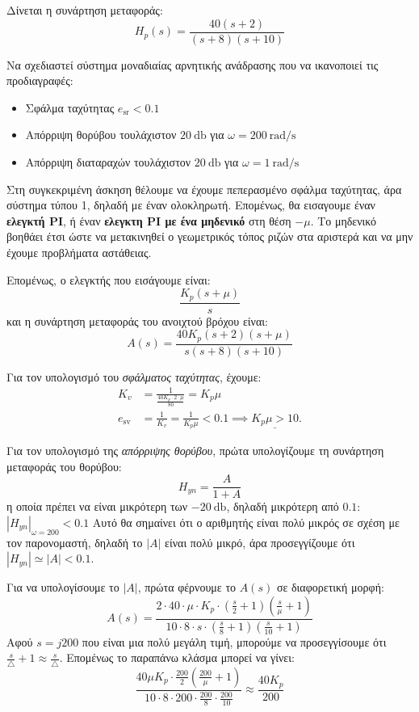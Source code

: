 \documentclass[11pt,a4paper,notitlepage,fleqn]{article}
\begin{document}
\begin{exercise}
Δίνεται η συνάρτηση μεταφοράς:
\[
H_p(s) = \frac{40(s+2)}{(s+8)(s+10)}
\]

Να σχεδιαστεί σύστημα μοναδιαίας αρνητικής ανάδρασης που να ικανοποιεί τις προδιαγραφές:
\begin{itemize}
	\item Σφάλμα ταχύτητας \( e_{\mathrm{sr}} < 0.1 \)
	\item Απόρριψη θορύβου τουλάχιστον \( \SI{20}{\decibel} \) για \( \omega = \SI{200}{\radian/\second} \)
	\item Απόρριψη διαταραχών τουλάχιστον \( \SI{20}{\decibel} \) για \( \omega = \SI{1}{\radian/\second} \)
\end{itemize}

\tcblower
Στη συγκεκριμένη άσκηση θέλουμε να έχουμε πεπερασμένο σφάλμα ταχύτητας, άρα σύστημα τύπου 1,
δηλαδή με έναν ολοκληρωτή. Επομένως, θα εισαγουμε έναν \textbf{ελεγκτή PI}, ή έναν
\textbf{ελεγκτη PI με ένα μηδενικό} στη θέση \( -μ \). Το μηδενικό βοηθάει έτσι ώστε να
μετακινηθεί ο γεωμετρικός τόπος ριζών στα αριστερά και να μην έχουμε προβλήματα αστάθειας.

Επομένως, ο ελεγκτής που εισάγουμε είναι:
\[
\frac{K_p(s+μ)}{s}
\]
και η συνάρτηση μεταφοράς του ανοιχτού βρόχου είναι:
\[
A(s) = \frac{40K_p(s+2)(s+μ)}{s(s+8)(s+10)}
\]

Για τον υπολογισμό του \textit{σφάλματος ταχύτητας}, έχουμε:
\begin{align*}
	K_v &= \frac{1}{\frac{40K_p\cdot 2\cdot μ}{80}} = K_p μ\\
	e_{\mathrm{sv}} &= \frac{1}{K_v} = \frac{1}{K_p μ} < 0.1 \implies
	\underline{K_p μ > 10}.
\end{align*}

Για τον υπολογισμό της \textit{απόρριψης θορύβου}, πρώτα υπολογίζουμε τη συνάρτηση μεταφοράς
του θορύβου:
\[
H_{yn} = \frac{A}{1+A}
\]
η οποία πρέπει να είναι μικρότερη των \( \SI{-20}{\decibel} \), δηλαδή μικρότερη από \( 0.1 \): \( \left|H_{yn}\right|_{\omega=200} < 0.1 \)
Αυτό θα σημαίνει ότι ο αριθμητής είναι πολύ μικρός σε σχέση με τον παρονομαστή, δηλαδή το
\( |A| \) είναι πολύ μικρό, άρα προσεγγίζουμε ότι \( \left|H_{yn}\right| \simeq |A| < 0.1 \).

Για να υπολογίσουμε το \( \left|A\right| \), πρώτα φέρνουμε το \( A(s) \) σε διαφορετική
μορφή:
\[
A(s) = \frac{2\cdot 40 \cdot μ \cdot K_p \cdot \left(\frac{s}{2}+1\right)\left(
	\frac{s}{μ}+1
	\right)}{10\cdot 8\cdot s \cdot \left( \frac{s}{8}+1 \right)\left(\frac{s}{10}+1\right)}
\]
Αφού \( s = j200 \) που είναι μια πολύ μεγάλη τιμή, μπορούμε να προσεγγίσουμε ότι
\( \frac{s}{\triangle} + 1 \approx \frac{s}{\triangle} \). Επομένως το παραπάνω κλάσμα μπορεί
να γίνει:
\[
\frac{40μK_p\cdot \frac{200}{2}\left(\frac{200}{μ}+1\right)}{10\cdot 8 \cdot 200 \cdot\frac{200}{8}\cdot\frac{200}{10}}
\approx \frac{40K_p}{200}
\]


\end{exercise}
\end{document}
